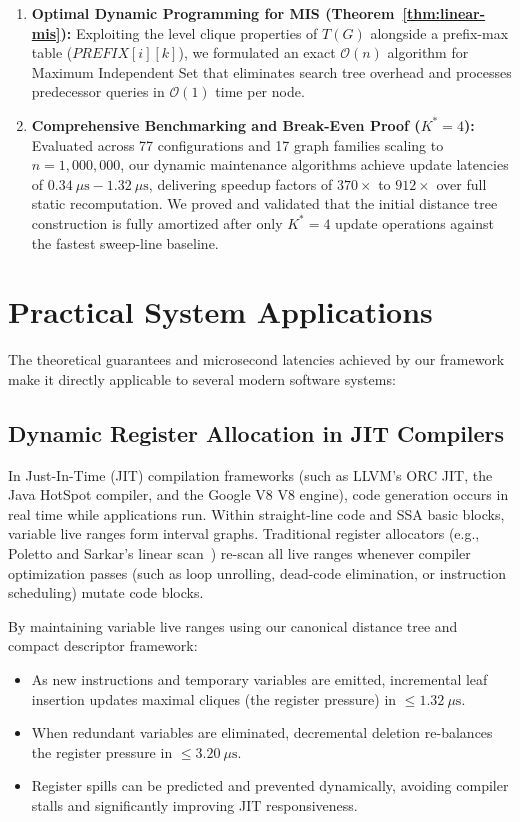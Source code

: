 \begin{enumerate}[label=\textbf{\arabic*.}]
    \item \textbf{Optimal Dynamic Programming for MIS (Theorem~\ref{thm:linear-mis}):} Exploiting the level clique properties of $T(G)$ alongside a prefix-max table ($PREFIX[i][k]$), we formulated an exact $\mathcal{O}(n)$ algorithm for Maximum Independent Set that eliminates search tree overhead and processes predecessor queries in $\mathcal{O}(1)$ time per node.
    
    \item \textbf{Comprehensive Benchmarking and Break-Even Proof ($K^* = 4$):} Evaluated across 77 configurations and 17 graph families scaling to $n = 1,000,000$, our dynamic maintenance algorithms achieve update latencies of $0.34\ \mu\text{s} - 1.32\ \mu\text{s}$, delivering speedup factors of $370\times$ to $912\times$ over full static recomputation. We proved and validated that the initial distance tree construction is fully amortized after only $K^* = 4$ update operations against the fastest sweep-line baseline.
\end{enumerate}

\section{Practical System Applications}
\label{sec:conclusion_applications}

The theoretical guarantees and microsecond latencies achieved by our framework make it directly applicable to several modern software systems:

\subsection{Dynamic Register Allocation in JIT Compilers}
In Just-In-Time (JIT) compilation frameworks (such as LLVM's ORC JIT, the Java HotSpot compiler, and the Google V8 V8 engine), code generation occurs in real time while applications run. Within straight-line code and SSA basic blocks, variable live ranges form interval graphs. Traditional register allocators (e.g., Poletto and Sarkar's linear scan~\cite{poletto1999linear}) re-scan all live ranges whenever compiler optimization passes (such as loop unrolling, dead-code elimination, or instruction scheduling) mutate code blocks.

By maintaining variable live ranges using our canonical distance tree and compact descriptor framework:
\begin{itemize}
    \item As new instructions and temporary variables are emitted, incremental leaf insertion updates maximal cliques (the register pressure) in $\le 1.32\ \mu\text{s}$.
    \item When redundant variables are eliminated, decremental deletion re-balances the register pressure in $\le 3.20\ \mu\text{s}$.
    \item Register spills can be predicted and prevented dynamically, avoiding compiler stalls and significantly improving JIT responsiveness.
\end{itemize}

